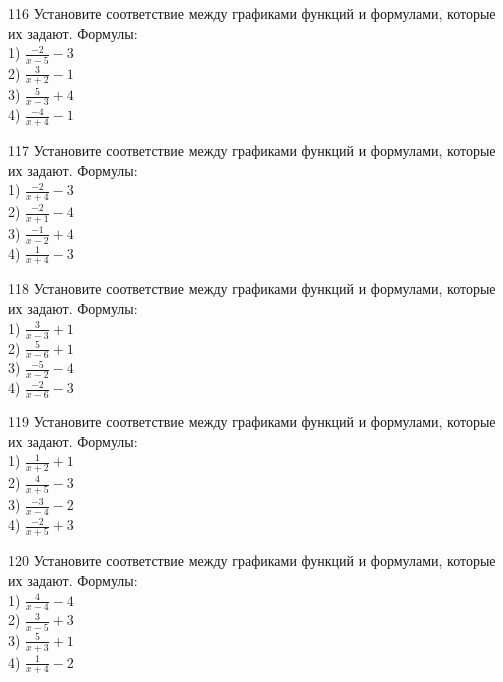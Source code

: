 \documentclass[4apaper]{article}
\begin{document}
\begin{taskBN}{116}
Установите соответствие между графиками функций и формулами, которые их задают. Формулы: \\1) $\frac{-2}{x-5}-3$\\2) $\frac{3}{x+2}-1$\\3) $\frac{5}{x-3}+4$\\4) $\frac{-4}{x+4}-1$
\end{taskBN}

\begin{taskBN}{117}
Установите соответствие между графиками функций и формулами, которые их задают. Формулы: \\1) $\frac{-2}{x+4}-3$\\2) $\frac{-2}{x+1}-4$\\3) $\frac{-1}{x-2}+4$\\4) $\frac{1}{x+4}-3$
\end{taskBN}

\begin{taskBN}{118}
Установите соответствие между графиками функций и формулами, которые их задают. Формулы: \\1) $\frac{3}{x-3}+1$\\2) $\frac{5}{x-6}+1$\\3) $\frac{-5}{x-2}-4$\\4) $\frac{-2}{x-6}-3$
\end{taskBN}

\begin{taskBN}{119}
Установите соответствие между графиками функций и формулами, которые их задают. Формулы: \\1) $\frac{1}{x+2}+1$\\2) $\frac{4}{x+5}-3$\\3) $\frac{-3}{x-4}-2$\\4) $\frac{-2}{x+5}+3$
\end{taskBN}

\begin{taskBN}{120}
Установите соответствие между графиками функций и формулами, которые их задают. Формулы: \\1) $\frac{4}{x-4}-4$\\2) $\frac{3}{x-5}+3$\\3) $\frac{5}{x+3}+1$\\4) $\frac{1}{x+4}-2$
\end{taskBN}
\end{document}
